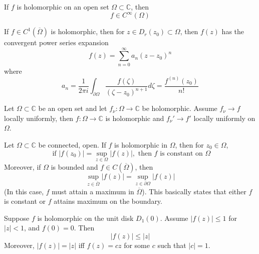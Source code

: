 \documentclass[openany]{book}
\newcommand{\C}{\mathbb{C}}
\begin{document}
\begin{prop}
    If $f$ is holomorphic on an open set $\Omega\subset\C$, then 
    \begin{equation*}
        f\in C^\infty(\Omega)
    \end{equation*}
\end{prop}


\begin{thm}
    If $f\in C^1(\overline{\Omega})$ is holomorphic, then for $z\in D_r(z_0)\subset\Omega$, then $f(z)$ has the convergent power series expansion 
    \begin{equation*}
        f(z)=\sum_{n=0}^\infty a_n(z-z_0)^n
    \end{equation*}
    where 
    \begin{equation*}
        a_n=\frac{1}{2\pi i}\int_{\partial\Omega}\frac{f(\zeta)}{(\zeta-z_0)^{n+1}}d\zeta=\frac{f^{(n)}(z_0)}{n!}
    \end{equation*}
\end{thm}

\begin{prop}
    Let $\Omega\subset\C$ be an open set and let $f_\nu:\Omega\to\C$ be holomorphic. Assume $f_\nu\to f$ locally uniformly, then $f:\Omega\to\C$ is holomorphic and $f_\nu'\to f'$ locally uniformly on $\Omega$.
\end{prop} 


\begin{prop}
    Let $\Omega\subset\C$ be connected, open. If $f$ is holomorphic in $\Omega$, then for $z_0\in\Omega$,
    \begin{equation*}
        \text{ if } |f(z_0)|=\sup_{z\in\Omega}|f(z)|, \text{ then } f \text{ is constant on $\Omega$}
    \end{equation*}
    Moreover, if $\Omega$ is bounded and $f\in C(\overline{\Omega})$, then 
    \begin{equation*}
        \sup_{z\in\overline{\Omega}}|f(z)|=\sup_{z\in\partial\Omega}|f(z)|
    \end{equation*}
    (In this case, $f$ must attain a maximum in $\overline{\Omega}$). This basically states that either $f$ is constant or $f$ attains maximum on the boundary.
\end{prop}


\begin{prop}
    Suppose $f$ is holomorphic on the unit disk $D_1(0)$. Assume $|f(z)|\leq 1$ for $|z|<1$, and $f(0)=0$. Then 
    \begin{equation*}
        |f(z)|\leq |z|
    \end{equation*}
    Moreover, $|f(z)|=|z|$ iff $f(z)=cz$ for some $c$ such that $|c|=1$.
\end{prop}
\end{document}
